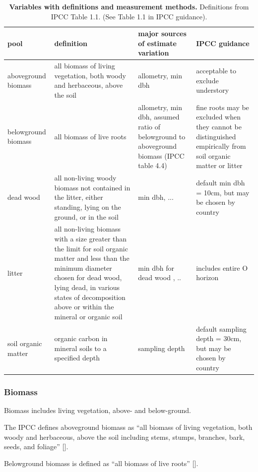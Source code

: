 \documentclass[, manuscript]{copernicus}
\begin{document}
\begin{table}

\caption{\label{tab:table_variables}\textbf{Variables with definitions and measurement methods.} Definitions from IPCC Table 1.1. (See Table 1.1 in IPCC guidance).}
\centering
\begin{tabu} to 
\hline
\textbf{pool} & \textbf{definition} & \textbf{major sources of estimate variation} & \textbf{IPCC guidance}\\
\hline
aboveground biomass & all biomass of living vegetation, both woody and herbaceous, above the soil & allometry, min dbh & acceptable to exclude understory\\
\hline
belowground biomass & all biomass of live roots & allometry, min dbh, assumed ratio of belowground to aboveground biomass (IPCC table 4.4) & fine roots may be excluded when they cannot be distinguished empirically from soil organic matter or litter\\
\hline
dead wood & all non-living woody biomass not contained in the litter, either standing, lying on the ground, or in the soil & min dbh,  ... & default min dbh = 10cm, but may be chosen by country\\
\hline
litter & all non-living biomass with a size greater than the limit for soil organic matter  and less than the minimum diameter chosen for dead wood, lying dead, in various states of decomposition above or within the mineral or organic soil & min dbh for dead wood , .. & includes entire O horizon\\
\hline
soil organic matter & organic carbon in mineral soils to a specified depth & sampling depth & default sampling depth = 30cm, but may be chosen by country\\
\hline
\end{tabu}
\end{table}

\subsubsection{Biomass}

Biomass includes living vegetation, above- and below-ground.

The IPCC defines aboveground biomass as ``all biomass of living
vegetation, both woody and herbaceous, above the soil including stems,
stumps, branches, bark, seeds, and foliage'' {[}{]}.

Belowground biomass is defined as ``all biomass of live roots'' {[}{]}.
\end{document}
